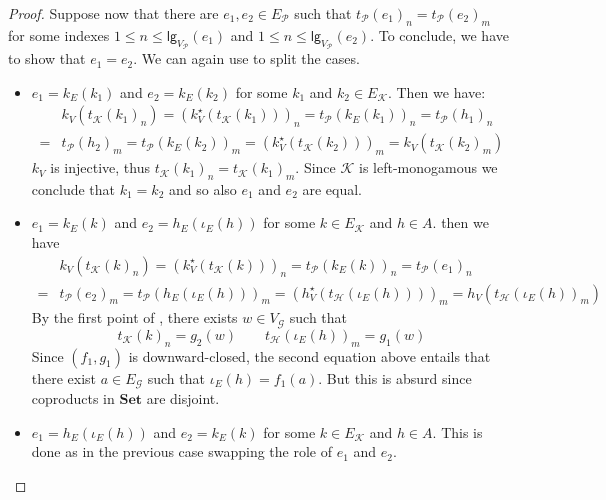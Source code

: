 \documentclass[3p]{elsarticle}
\newcommand{\lgh}{\mathsf{lg}}
\newcommand{\Set}{\mathbf{Set}}
\theoremstyle{remark}
\theoremstyle{definition}
\begin{document}
\begin{proof}
 Suppose now that there are $e_1, e_2\in E_{\mathcal{P}}$ such that $t_{\mathcal{P}}(e_1)_n=t_{\mathcal{P}}(e_2)_m$ for some indexes $1\leq n \leq \lgh_{V_{\mathcal{P}}}(e_1)$ and $1\leq n \leq \lgh_{V_{\mathcal{P}}}(e_2)$. To conclude, we have to show that $e_1=e_2$. We can again use  to split the cases.
 
\begin{itemize}
	\item $e_1=k_E(k_1)$ and $e_2=k_E(k_2)$ for some $k_1$ and $k_2\in E_{\mathcal{K}}$. Then we have:
	\begin{align*}
		&k_V(t_{\mathcal{K}}(k_1)_n)=(k^\star_V(t_{\mathcal{K}}(k_1)))_n=t_{\mathcal{P}}(k_E(k_1))_n=t_{\mathcal{P}}(h_1)_n\\=&t_{\mathcal{P}}(h_2)_m=t_{\mathcal{P}}(k_E(k_2))_m=(k^\star_V(t_{\mathcal{K}}(k_2)))_m=k_V(t_{\mathcal{K}}(k_2)_m)
	\end{align*}
	$k_V$ is injective, thus $t_{\mathcal{K}}(k_1)_n=t_{\mathcal{K}}(k_1)_m$. Since  $\mathcal{K}$ is left-monogamous we conclude that $k_1=k_2$ and so also $e_1$ and $e_2$ are equal.
	\item $e_1=k_E(k)$ and $e_2=h_E(\iota_{E}(h))$ for some $k\in E_{\mathcal{K}}$ and $h\in A$. 
	then we have
	\begin{align*}
		&k_V(t_{\mathcal{K}}(k)_n)= (k^\star_V(t_{\mathcal{K}}(k)))_n=t_{\mathcal{P}}(k_E(k))_n=t_{\mathcal{P}}(e_1)_n\\=&t_{\mathcal{P}}(e_2)_m=t_{\mathcal{P}}(h_E(\iota_E(h)))_m=(h^\star_V(t_{\mathcal{H}}(\iota_E(h))))_m= h_V(t_{\mathcal{H}}(\iota_{E}(h))_m)
	\end{align*}
	By the first point of , there exists $w\in V_{\mathcal{G}}$ such that 
	\[t_{\mathcal{K}}(k)_n=g_2(w) \qquad t_{\mathcal{H}}(\iota_{E}(h))_m=g_1(w)\]
Since $(f_1, g_1)$ is downward-closed, the second equation above entails that there exist $a\in E_{\mathcal{G}}$ such that $\iota_E(h)=f_1(a)$. But this is absurd since coproducts in $\Set$ are disjoint.
	
	\item  $e_1=h_E(\iota_{E}(h))$ and $e_2=k_E(k)$ for some $k\in E_{\mathcal{K}}$ and $h\in A$. This is done as in the previous case swapping the role of $e_1$ and $e_2$.
	

\end{itemize}
\end{proof}
\end{document}
